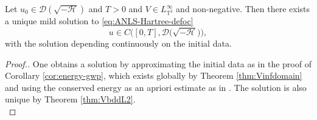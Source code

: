 {\color[HTML]{000000}\begin{prop}
  \label{thm:Vinftyenergywellposedeness}Let $u_0 \in \mathcal{D} \left(
  \sqrt{- \mathcal{H}} \right)$ and $T > 0$ and $V \in
  L_{\mathbb{T}^3}^{\infty} $ and non-negative. Then there exists a unique
  mild solution to \eqref{eq:ANLS-Hartree-defoc}
  \[ u \in C \big( [0, T], \mathcal{D} \big( \sqrt{- \mathcal{H}} \big)
     \big), \]
  with the solution depending continuously on the initial data.
\end{prop}

\begin{proof}[Proof.]
  One obtains a solution by approximating the initial data as in the proof of
  Corollary \ref{cor:energy-gwp}, which exists globally by Theorem
  \ref{thm:Vinfdomain} and using the conserved energy as an apriori estimate
  as in {\cite{GUZ20}}. The solution is also unique by Theorem
  \ref{thm:VbddL2}.\\
  

\end{proof}}
